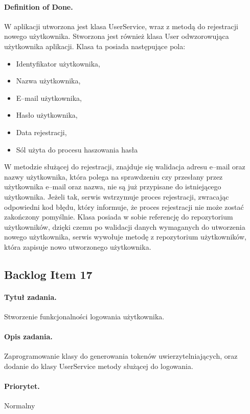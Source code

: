 ﻿\documentclass[a4paper]{article}
\begin{document}
\paragraph{Definition of Done.} W aplikacji utworzona jest klasa UserService, wraz z metodą do rejestracji nowego użytkownika. Stworzona jest również klasa User odwzorowująca użytkownika aplikacji. Klasa ta posiada następujące pola: 
\begin{itemize}
\item Identyfikator użytkownika, 
\item Nazwa użytkownika,
\item E--mail użytkownika, 
\item Hasło użytkownika, 
\item Data rejestracji, 
\item Sól użyta do procesu haszowania hasła
\end{itemize}
W metodzie służącej do rejestracji, znajduje się walidacja adresu e--mail oraz nazwy użytkownika, która polega na sprawdzeniu czy przesłany przez użytkownika e--mail oraz nazwa, nie są już przypisane do istniejącego użytkownika. Jeżeli tak, serwis wstrzymuje proces rejestracji, zwracając odpowiedni kod błędu, który informuje, że proces rejestracji nie może zostać zakończony pomyślnie. Klasa posiada w sobie referencję do repozytorium użytkowników, dzięki czemu po walidacji danych wymaganych do utworzenia nowego użytkownika, serwis wywołuje metodę z repozytorium użytkowników, która zapisuje nowo utworzonego użytkownika. 

\subsection{Backlog Item 17} 
\paragraph{Tytuł zadania.} Stworzenie funkcjonalności logowania użytkownika.
\paragraph{Opis zadania.} Zaprogramowanie klasy do generowania tokenów uwierzytelniających, oraz dodanie do klasy UserService metody służącej do logowania.
\paragraph{Priorytet.} Normalny
\end{document}
